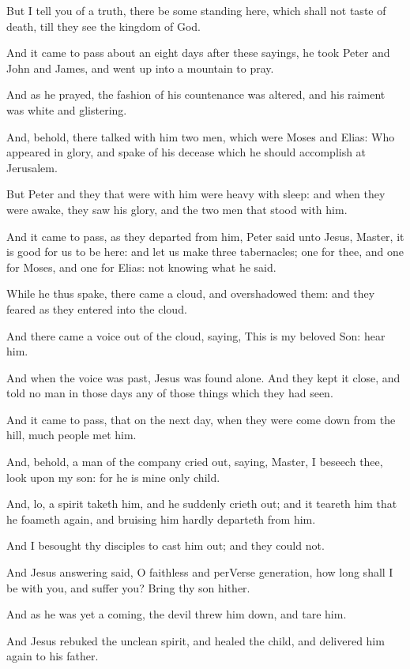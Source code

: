 \Verse But I tell you of a truth, there be some standing here, which shall not taste of death, till they see the kingdom of God.

\Verse And it came to pass about an eight days after these sayings, he took Peter and John and James, and went up into a mountain to pray.

\Verse And as he prayed, the fashion of his countenance was altered, and his raiment was white and glistering.

\Verse And, behold, there talked with him two men, which were Moses and Elias: \Verse Who appeared in glory, and spake of his decease which he should accomplish at Jerusalem.

\Verse But Peter and they that were with him were heavy with sleep: and when they were awake, they saw his glory, and the two men that stood with him.

\Verse And it came to pass, as they departed from him, Peter said unto Jesus, Master, it is good for us to be here: and let us make three tabernacles; one for thee, and one for Moses, and one for Elias: not knowing what he said.

\Verse While he thus spake, there came a cloud, and overshadowed them: and they feared as they entered into the cloud.

\Verse And there came a voice out of the cloud, saying, This is my beloved Son: hear him.

\Verse And when the voice was past, Jesus was found alone. And they kept it close, and told no man in those days any of those things which they had seen.

\Verse And it came to pass, that on the next day, when they were come down from the hill, much people met him.

\Verse And, behold, a man of the company cried out, saying, Master, I beseech thee, look upon my son: for he is mine only child.

\Verse And, lo, a spirit taketh him, and he suddenly crieth out; and it teareth him that he foameth again, and bruising him hardly departeth from him.

\Verse And I besought thy disciples to cast him out; and they could not.

\Verse And Jesus answering said, O faithless and perVerse generation, how long shall I be with you, and suffer you? Bring thy son hither.

\Verse And as he was yet a coming, the devil threw him down, and tare him.

And Jesus rebuked the unclean spirit, and healed the child, and delivered him again to his father.

